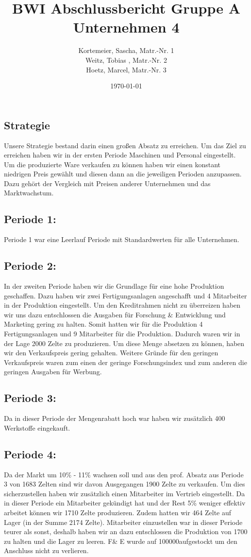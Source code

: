 \documentclass[a4paper, 12pt]{report}
\title{BWI Abschlussbericht Gruppe A Unternehmen 4}
\author{Kortemeier, Sascha, Matr.-Nr. 1 \\
Weitz, Tobias , Matr.-Nr. 2 \\
Hoetz, Marcel, Matr.-Nr. 3}
\date{\today}
\begin{document}
\maketitle
\tableofcontents



\begin{flushleft}
\chapter{Strategie}
Unsere Strategie bestand darin einen großen Absatz zu erreichen. 
Um das Ziel zu erreichen haben wir in der ersten Periode Maschinen und Personal eingestellt. 
Um die produzierte Ware verkaufen zu können haben wir einen konstant niedrigen Preis gewählt und diesen dann an die jeweiligen Perioden anzupassen. 
Dazu gehört der Vergleich mit Preisen anderer Unternehmen und das Marktwachstum. 

\section{Periode 1:}
Periode 1 war eine Leerlauf Periode mit Standardwerten für alle Unternehmen.	

\section{Periode 2:}
In der zweiten Periode haben wir die Grundlage für eine hohe Produktion geschaffen.
Dazu haben wir zwei Fertigungsanlagen angeschafft und 4 Mitarbeiter in der Produktion eingestellt.
Um den Kreditrahmen nicht zu überreizen haben wir uns dazu entschlossen die Ausgaben für Forschung \& Entwicklung und Marketing gering zu halten.
Somit hatten wir für die Produktion 4 Fertigungsanlagen und 9 Mitarbeiter für die Produktion.
Dadurch waren wir in der Lage 2000 Zelte zu produzieren.
Um diese Menge absetzen zu können, haben wir den Verkaufspreis gering gehalten.
Weitere Gründe für den geringen Verkaufspreis waren zum einen der geringe Forschungsindex und zum anderen die geringen Ausgaben für Werbung.

\section{Periode 3:}
Da in dieser Periode der Mengenrabatt hoch war haben wir zusätzlich 400 Werkstoffe eingekauft. 

\section{Periode 4:}
Da der Markt um 10\% - 11\% wachsen soll und aus den prof. Absatz aus Periode 3 von 1683 Zelten sind wir davon Ausgegangen 1900 Zelte zu verkaufen.
Um dies sicherzustellen haben wir zusätzlich einen Mitarbeiter im Vertrieb eingestellt.
Da in dieser Periode ein Mitarbeiter gekündigt hat und der Rest 5\% weniger effektiv arbeitet können wir  1710 Zelte produzieren.
Zudem hatten wir 464 Zelte auf Lager (in der Summe 2174 Zelte).
Mitarbeiter einzustellen war in dieser Periode teurer als sonst,
deshalb haben wir an dazu entschlossen die Produktion von 1700 zu halten und die Lager zu leeren.
F\& E wurde auf 100000\texteuro aufgestockt um den Anschluss nicht zu verlieren.  


\end{flushleft}
\end{document}
